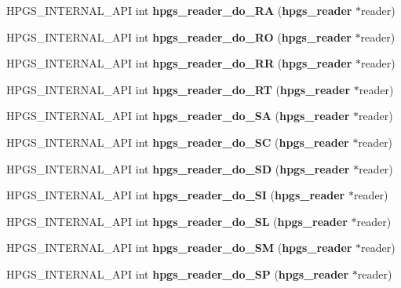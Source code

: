 \begin{CompactItemize}
\item 
HPGS\_\-INTERNAL\_\-API int \textbf{hpgs\_\-reader\_\-do\_\-RA} ({\bf hpgs\_\-reader} $\ast$reader)\label{group__reader_g5dc2941db3a63239f3339281e332c6f4}

\item 
HPGS\_\-INTERNAL\_\-API int \textbf{hpgs\_\-reader\_\-do\_\-RO} ({\bf hpgs\_\-reader} $\ast$reader)\label{group__reader_gda03ea2ce58484b8b62c357e9049d914}

\item 
HPGS\_\-INTERNAL\_\-API int \textbf{hpgs\_\-reader\_\-do\_\-RR} ({\bf hpgs\_\-reader} $\ast$reader)\label{group__reader_g6f0e9b813af1d2525059e7ce16cf82b1}

\item 
HPGS\_\-INTERNAL\_\-API int \textbf{hpgs\_\-reader\_\-do\_\-RT} ({\bf hpgs\_\-reader} $\ast$reader)\label{group__reader_gf3dbd72002d495479a4eff8f3602cd0e}

\item 
HPGS\_\-INTERNAL\_\-API int \textbf{hpgs\_\-reader\_\-do\_\-SA} ({\bf hpgs\_\-reader} $\ast$reader)\label{group__reader_g7e0abf5b2426bd0e603828501bb36c9e}

\item 
HPGS\_\-INTERNAL\_\-API int \textbf{hpgs\_\-reader\_\-do\_\-SC} ({\bf hpgs\_\-reader} $\ast$reader)\label{group__reader_ge3fbbafae8de8b6dea831b9bf24242d3}

\item 
HPGS\_\-INTERNAL\_\-API int \textbf{hpgs\_\-reader\_\-do\_\-SD} ({\bf hpgs\_\-reader} $\ast$reader)\label{group__reader_gc381a958a3fa32fd544c10c225986005}

\item 
HPGS\_\-INTERNAL\_\-API int \textbf{hpgs\_\-reader\_\-do\_\-SI} ({\bf hpgs\_\-reader} $\ast$reader)\label{group__reader_gdaad71bd774a907fde56590f017b1c3f}

\item 
HPGS\_\-INTERNAL\_\-API int \textbf{hpgs\_\-reader\_\-do\_\-SL} ({\bf hpgs\_\-reader} $\ast$reader)\label{group__reader_g3f43c65d53fa49d9928536e2340cc1e5}

\item 
HPGS\_\-INTERNAL\_\-API int \textbf{hpgs\_\-reader\_\-do\_\-SM} ({\bf hpgs\_\-reader} $\ast$reader)\label{group__reader_g141bb3fe1f17f7cdbddefef00990fd9d}

\item 
HPGS\_\-INTERNAL\_\-API int \textbf{hpgs\_\-reader\_\-do\_\-SP} ({\bf hpgs\_\-reader} $\ast$reader)\label{group__reader_gf6d8257afede41554e0ed06b30b8df8b}


\end{CompactItemize}
